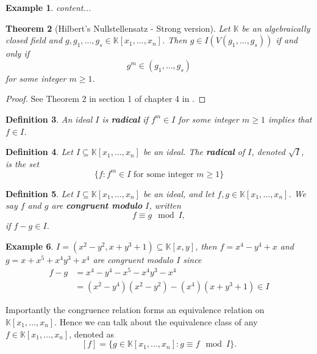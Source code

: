 \documentclass[a4paper,12pt]{article}
\newtheorem{theorem}{Theorem}[section]
\newtheorem{definition}[theorem]{Definition}
\newtheorem{example}[theorem]{Example}
\newcommand{\KK}{\mathbb{K}}
\begin{document}
\begin{example}
	content...
\end{example}

\begin{theorem}[Hilbert's Nullstellensatz - Strong version]
	Let $ \KK $ be an algebraically closed field and $ g,g_1,\ldots,g_s\in  \KK[x_1,\ldots,x_n]$. Then $ g\in I(V(g_1,\ldots,g_s)) $ if and only if 
	\[
	g^m\in (g_1,\ldots,g_s)
	\]
	for some integer $ m\geq 1 $.
\end{theorem}
\begin{proof}
	See Theorem 2 in section 1 of chapter 4 in \cite{CoxLittleOshea}.
\end{proof}

\begin{definition}
	An ideal $I$ is \textbf{radical} if $f^m \in I$ for some integer $m \geq 1$ implies that $f \in I$.
\end{definition}

\begin{definition}
	Let $I \subseteq \KK[x_1, \ldots, x_n]$ be an ideal. The \textbf{radical} of $I$, denoted $\sqrt{I}$, is the set $$ \{f : f^m \in I \text{ for some integer } m \geq 1 \}$$
\end{definition}

\begin{definition}
	Let $I \subseteq \KK[x_1, \ldots, x_n]$ be an ideal, and let $f,g \in \KK[x_1, \ldots, x_n]$. We say $f$ and $g$ are \textbf{congruent modulo} $I$, written $$ f \equiv g \mod I,$$ if $f-g\in I$.
\end{definition}
\begin{example}
	$I = (x^2-y^2, x+y^3+1) \subseteq \KK[x,y]$, then $f = x^4-y^4+x$ and $g=x+x^5+x^4y^3+x^4$ are congruent modulo $I$ since
	\begin{equation*}
	\begin{split}
	f-g & = x^4 -y^4 - x^5-x^4y^3-x^4 \\
	& = (x^2-y^4)(x^2-y^2)-(x^4)(x+y^3+1) \in I
	\end{split}
	\end{equation*}
\end{example}
Importantly the congruence relation forms an equivalence relation on $\KK[x_1, \ldots, x_n]$. Hence we can talk about the equivalence class of any $f \in \KK[x_1, \ldots, x_n]$, denoted as $$ [f] = \{g \in \KK[x_1, \ldots, x_n] : g \equiv f \mod I\}. $$
\end{document}
